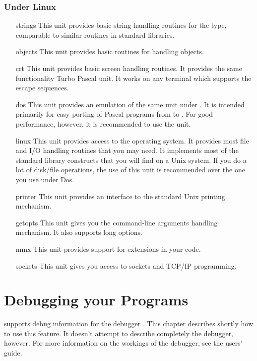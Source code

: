 \documentclass{report}
\begin{document}
\subsection{Under Linux}
\begin{itemize}
\item [strings] This unit provides basic
string handling routines for the  type, comparable to similar
routines in standard  libraries.
\item [objects] This unit provides basic
routines for handling objects.
\item [crt] This unit provides basic screen
handling routines. It provides the same functionality Turbo Pascal 
unit. It works on any terminal which supports the  escape
sequences.
\item [dos] This unit provides an emulation of the
same unit under \dos. It is intended primarily for easy porting of Pascal
programs from \dos to \linux. For good performance, however, it is
recommended to use the  unit.
\item [linux] This unit provides access to the
\linux operating system. It provides most file and I/O handling routines
that you may need. It implements most of the standard  library constructs
that you will find on a Unix system. If you do a lot of disk/file
operations, the use of this unit is recommended over the one you use under
Dos.
\item [printer] This unit provides an
interface to the standard Unix printing mechanism.
\item [getopts] This unit gives you the
\gnu {} command-line arguments  handling mechanism. 
It also supports long options.
\item [mmx] This unit provides support for  extensions in your
code.
\item [sockets] This unit gives you access to sockets and TCP/IP
programming.
\end{itemize}


\chapter{Debugging your Programs}

\fpc supports debug information for the \gnu debugger . 
This chapter describes shortly how to use this feature. It doesn't attempt
to describe completely the \gnu debugger, however.
For more information on the workings of the \gnu debugger, see the 
users' guide.
\end{document}
